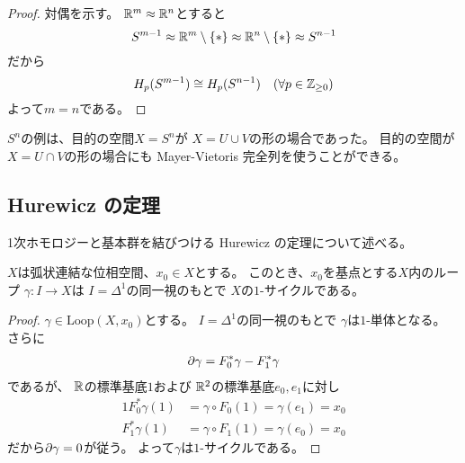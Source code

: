\documentclass[report]{jlreq}
\begin{document}
\begin{proof}
    対偶を示す。
    $\mathbb{R}^m \approx \mathbb{R}^n$とすると
    \begin{equation}
        S^{m - 1}
            \approx \mathbb{R}^m \setminus \{ * \}
            \approx \mathbb{R}^n \setminus \{ * \}
            \approx S^{n - 1}
    \end{equation}
    だから
    \begin{equation}
        H_p(S^{m - 1}) \cong H_p(S^{n - 1})
            \quad (\forall p \in \mathbb{Z}_{\ge 0})
    \end{equation}
    よって$m = n$である。
\end{proof}

\begin{example}
    $S^n$の例は、目的の空間$X = S^n$が
    $X = U \cup V$の形の場合であった。
    目的の空間が$X = U \cap V$の形の場合にも
    Mayer-Vietoris 完全列を使うことができる。

\end{example}

\subsection{Hurewicz の定理}

1次ホモロジーと基本群を結びつける
Hurewicz の定理について述べる。

\begin{lemma}
    $X$は弧状連結な位相空間、$x_0 \in X$とする。
    このとき、$x_0$を基点とする$X$内のループ
    $\gamma \colon I \to X$は
    $I = \Delta^1$の同一視のもとで
    $X$の$1$-サイクルである。
\end{lemma}

\begin{proof}
    $\gamma \in \mathrm{Loop}(X, x_0)$とする。
    $I = \Delta^1$の同一視のもとで
    $\gamma$は$1$-単体となる。
    さらに
    \begin{alignat}{1}
        \partial \gamma = F_0^* \gamma - F_1^* \gamma
    \end{alignat}
    であるが、
    $\mathbb{R}$の標準基底$1$および
    $\mathbb{R}^2$の標準基底$e_0, e_1$に対し
    \begin{alignat}{1}
        F_0^* \gamma(1) &= \gamma \circ F_0(1) = \gamma(e_1) = x_0 \\
        F_1^* \gamma(1) &= \gamma \circ F_1(1) = \gamma(e_0) = x_0
    \end{alignat}
    だから$\partial \gamma = 0$が従う。
    よって$\gamma$は$1$-サイクルである。
\end{proof}
\end{document}
